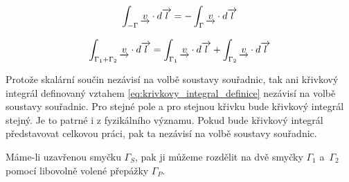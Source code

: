 \begin{equation}
\label{eq:krivkovy_integral_opacny}
\begin{split}
\int_{-\Gamma} \underrightarrow{v} \cdot d\overrightarrow{l} = -\int_{\Gamma} \underrightarrow{v} \cdot d\overrightarrow{l}
\end{split}
\end{equation}

\begin{equation}
\label{eq:krivkovy_integral_soucet}
\begin{split}
\int_{\Gamma_1 + \Gamma_2} \underrightarrow{v} \cdot d\overrightarrow{l} = \int_{\Gamma_1} \underrightarrow{v} \cdot d\overrightarrow{l} + \int_{\Gamma_2} \underrightarrow{v} \cdot d\overrightarrow{l}
\end{split}
\end{equation}

Protože skalární součin nezávisí na volbě soustavy souřadnic, tak ani křivkový integrál definovaný vztahem \eqref{eq:krivkovy_integral_definice} nezávisí na volbě soustavy souřadnic. Pro stejné pole a pro stejnou křivku bude křivkový integrál stejný. Je to patrné i z fyzikálního významu. Pokud bude křivkový integrál představovat celkovou práci, pak ta nezávisí na volbě soustavy souřadnic.

Máme-li uzavřenou smyčku \(\Gamma_S\), pak ji můžeme rozdělit na dvě smyčky \(\Gamma_1\) a~\(\Gamma_2\) pomocí libovolně volené přepážky \(\Gamma_P\).


